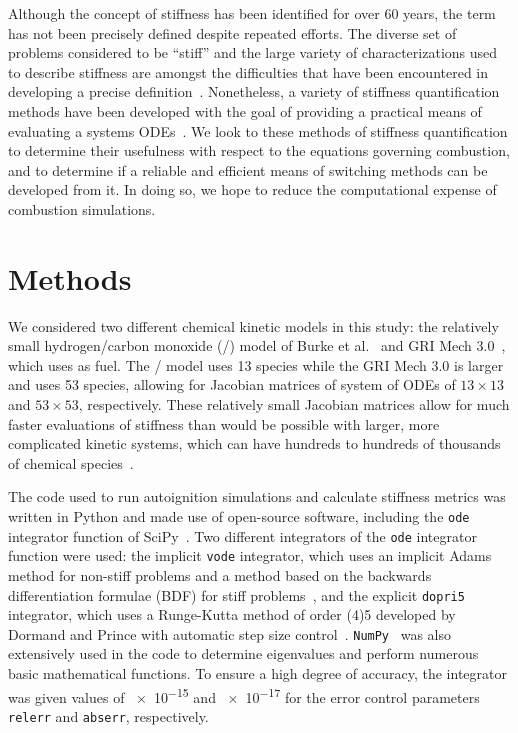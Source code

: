 \documentclass[12pt]{ussci}
\begin{document}
Although the concept of stiffness has been identified for over 60 years, the term has not been precisely defined despite repeated efforts.
The diverse set of problems considered to be ``stiff'' and the large variety of characterizations used to describe stiffness are amongst the difficulties that have been encountered in developing a precise definition~\cite{Soderlind2014}.
Nonetheless, a variety of stiffness quantification methods have been developed with the goal of providing a practical means of evaluating a systems ODEs~\cite{Soderlind2014,Shampine1985,Brugnano2011,Lambert1973ComputationalEquations,Hairer1996SolvingII}.
We look to these methods of stiffness quantification to determine their usefulness with respect to the equations governing combustion, and to determine if a reliable and efficient means of switching methods can be developed from it.
In doing so, we hope to reduce the computational expense of combustion simulations.

\section{Methods}
We considered two different chemical kinetic models in this study: the relatively small hydrogen\slash carbon monoxide (\slash {}) model of Burke et al.~\cite{Burke:2011fh} and GRI Mech 3.0~\cite{grimech3}, which uses  as fuel.
The \slash {} model uses 13 species while the GRI Mech 3.0 is larger and uses 53 species, allowing for Jacobian matrices of system of ODEs of $13 \times 13$ and $53 \times 53$, respectively.
These relatively small Jacobian matrices allow for much faster evaluations of stiffness than would be possible with larger, more complicated kinetic systems, which can have hundreds to hundreds of thousands of chemical species~\cite{Niemeyer:2013}.

The code used to run autoignition simulations and calculate stiffness metrics was written in Python and made use of open-source software, including the \texttt{ode} integrator function of SciPy~\cite{SciPy}.
Two different integrators of the \texttt{ode} integrator function were used: the implicit \texttt{vode} integrator, which uses an implicit Adams method for non-stiff problems and a method based on the backwards differentiation formulae (BDF) for stiff problems~\cite{Brown1989}, and the explicit \texttt{dopri5} integrator, which uses a Runge-Kutta method of order (4)5 developed by Dormand and Prince with automatic step size control~\cite{E.HairerSPNorsett1990}.
\texttt{NumPy}~\cite{VanDerWalt2011} was also extensively used in the code to determine eigenvalues and perform numerous basic mathematical functions.
To ensure a high degree of accuracy, the integrator was given values of \num{e-15} and \num{e-17} for the error control parameters \texttt{relerr} and \texttt{abserr}, respectively.
\end{document}
